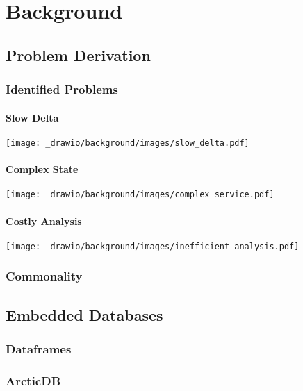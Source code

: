 \chapter{Background}

\section{Problem Derivation}
\subsection{Identified Problems}
\subsubsection{Slow Delta}
\begin{center}
    \texttt{[image: \_drawio/background/images/slow\_delta.pdf]}
\end{center}

\subsubsection{Complex State}
\begin{center}
    \texttt{[image: \_drawio/background/images/complex\_service.pdf]}
\end{center}
\subsubsection{Costly Analysis}
\begin{center}
    \texttt{[image: \_drawio/background/images/inefficient\_analysis.pdf]}
\end{center}

\subsection{Commonality}

\section{Embedded Databases}

\subsection{Dataframes}
\subsection{ArcticDB}
